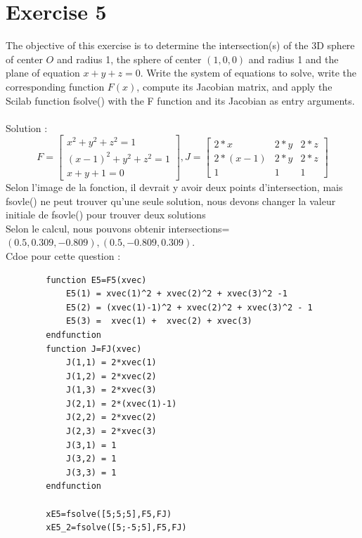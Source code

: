 \documentclass[11pt]{article}
\begin{document}
    \section*{Exercise 5}
    The objective of this exercise is to determine the intersection(s) of the 3D sphere of center $O$ and radius 1, the sphere of center $(1,0,0)$ and radius 1 and the plane of equation $x + y +z = 0$. Write the system of equations to solve, write the corresponding function $F(x)$, compute its Jacobian matrix, and apply the Scilab function fsolve() with the F function and its Jacobian as entry arguments.\\
    ~\\
    Solution :
    $$
    F=
    \begin{bmatrix}
        x^2+y^2+z^2=1\\
        (x-1)^2+y^2+z^2=1\\
        x+y+1=0
    \end{bmatrix}
    ,
    J=
    \begin{bmatrix}
        2*x & 2*y & 2*z\\
        2*(x-1) & 2*y & 2*z\\
        1 & 1 & 1
    \end{bmatrix}
    $$
    Selon l'image de la fonction, il devrait y avoir deux points d'intersection, mais fsovle() ne peut trouver qu'une seule solution, nous devons changer la valeur initiale de fsovle() pour trouver deux solutions\\
    Selon le calcul, nous pouvons obtenir intersections=$(0.5,0.309,-0.809),(0.5,-0.809,0.309)$. 
    ~\\
    Cdoe pour cette question :
    \begin{verbatim}
        function E5=F5(xvec)
            E5(1) = xvec(1)^2 + xvec(2)^2 + xvec(3)^2 -1
            E5(2) = (xvec(1)-1)^2 + xvec(2)^2 + xvec(3)^2 - 1
            E5(3) =  xvec(1) +  xvec(2) + xvec(3)
        endfunction
        function J=FJ(xvec)
            J(1,1) = 2*xvec(1)
            J(1,2) = 2*xvec(2)
            J(1,3) = 2*xvec(3)
            J(2,1) = 2*(xvec(1)-1)
            J(2,2) = 2*xvec(2)
            J(2,3) = 2*xvec(3)
            J(3,1) = 1
            J(3,2) = 1
            J(3,3) = 1
        endfunction

        xE5=fsolve([5;5;5],F5,FJ)
        xE5_2=fsolve([5;-5;5],F5,FJ)
    \end{verbatim}
\end{document}
